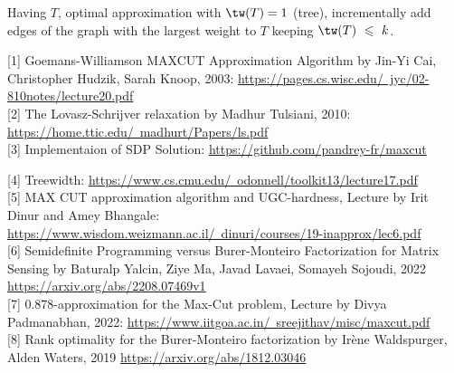 \documentclass{article}
\renewcommand{\le}{\ \leqslant\ }
\begin{document}
Having $T$, optimal approximation with $\tw(T)=1$ (tree), incrementally add edges of the graph with the largest weight to $T$ keeping $\tw(T) \le k$.











[1] Goemans-Williamson MAXCUT Approximation Algorithm by Jin-Yi Cai, Christopher Hudzik, Sarah Knoop, 2003:
\href{https://pages.cs.wisc.edu/~jyc/02-810notes/lecture20.pdf}{https://pages.cs.wisc.edu/~jyc/02-810notes/lecture20.pdf} \\

[2] The Lovasz-Schrijver relaxation by Madhur Tulsiani, 2010: 
\href{https://home.ttic.edu/~madhurt/Papers/ls.pdf}{https://home.ttic.edu/~madhurt/Papers/ls.pdf} \\

[3] Implementaion of SDP Solution: \href{}{https://github.com/pandrey-fr/maxcut}

[4] Treewidth: 
\href{https://www.cs.cmu.edu/~odonnell/toolkit13/lecture17.pdf}{https://www.cs.cmu.edu/~odonnell/toolkit13/lecture17.pdf}\\

[5] MAX CUT approximation algorithm and UGC-hardness, Lecture by Irit Dinur and Amey Bhangale:
\href{https://www.wisdom.weizmann.ac.il/~dinuri/courses/19-inapprox/lec6.pdf}{https://www.wisdom.weizmann.ac.il/~dinuri/courses/19-inapprox/lec6.pdf} \\

[6] Semidefinite Programming versus Burer-Monteiro Factorization for Matrix
Sensing by Baturalp Yalcin, Ziye Ma, Javad Lavaei, Somayeh Sojoudi, 2022
\href{https://arxiv.org/abs/2208.07469v1}{https://arxiv.org/abs/2208.07469v1}\\

[7] 0.878-approximation for the Max-Cut problem, Lecture by Divya Padmanabhan, 2022: \href{https://www.iitgoa.ac.in/~sreejithav/misc/maxcut.pdf}{https://www.iitgoa.ac.in/~sreejithav/misc/maxcut.pdf}\\

[8] Rank optimality for the Burer-Monteiro factorization by Irène Waldspurger, Alden Waters, 2019 
\href{https://arxiv.org/abs/1812.03046}{https://arxiv.org/abs/1812.03046}\\
\end{document}
